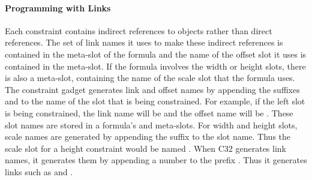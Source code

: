 \paragraph{Programming with Links}

Each constraint contains indirect references to objects rather than
direct references. The set of link names it uses to make these indirect
references is contained in the 
meta-slot of the formula and the name
of the offset slot it uses is contained in the  meta-slot.
If the formula
involves the width or height slots, there is also a  meta-slot,
containing the name of the scale slot that the formula uses.
The constraint gadget generates link and offset names by appending the
suffixes  and  to the name of the slot that is being
constrained. For example, if the left slot is being constrained, the
link name will be  and the offset name will be
.
These slot names are stored in a formula's  and 
meta-slots.
For width and height slots, scale names are generated by appending the
suffix  to the slot name. Thus the scale slot for a height constraint
would be named . When C32 generates link names, it generates
them by appending a number to the prefix . Thus it generates
links such as  and .


